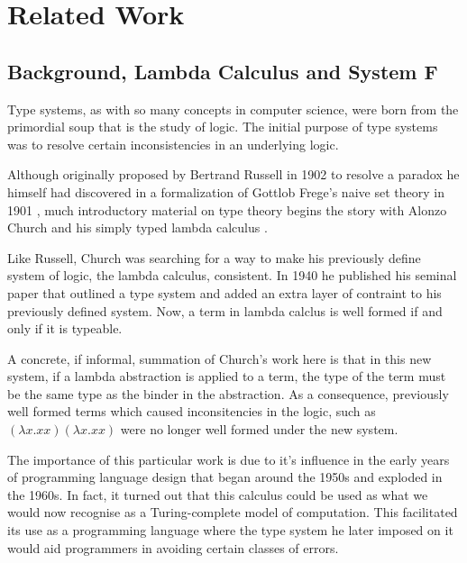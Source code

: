 \documentclass{ProgressReport}[2020/09/15]
\begin{document}
        \chapter{Related Work}

        \section{Background, Lambda Calculus and System F}

          Type systems, as with so many concepts in computer science,
          were born from the primordial soup that is the study of
          logic. The initial purpose of type systems was to resolve
          certain inconsistencies in an underlying logic. 
      
          Although originally proposed by Bertrand Russell in 1902 to
          resolve a paradox he himself had discovered in a formalization of
          Gottlob Frege's naive set theory in 1901 \cite{Russell1901}, much
          introductory material on type theory begins the story with
          Alonzo Church and his simply typed lambda calculus
          \cite{church1940}.
      
          Like Russell, Church was searching for a way to make his
          previously define system of logic, the lambda calculus,
          consistent. In 1940 he published his seminal paper that outlined a
          type system and added an extra layer of contraint to his
          previously defined system. Now, a term in lambda calclus is well
          formed if and only if it is typeable.
      
          A concrete, if informal, summation of Church's work here is that
          in this new system, if a lambda abstraction is applied to a term,
          the type of the term must be the same type as the binder in the
          abstraction. As a consequence, previously well formed terms which
          caused inconsitencies in the logic, such as
          $ (\lambda x.xx)(\lambda x.xx)  $
          were no longer well formed under the new system.
      
          The importance of this particular work is due to it's influence in
          the early years of programming language design that began around
          the 1950s and exploded in the 1960s. In fact, it turned out
          that this calculus could be used as what we would now
          recognise as a Turing-complete model of computation. This
          facilitated its use as a programming language where the type
          system he later imposed on it would aid programmers in
          avoiding certain classes of errors. 
      
\end{document}
